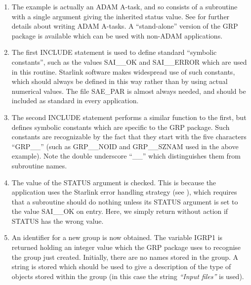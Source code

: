\begin{enumerate}

\item The example is actually an ADAM A-task, and so consists of a subroutine with
a single argument giving the inherited status value. See
 for further
details about writing ADAM A-tasks. A ``stand-alone'' version of the GRP package
is available which can be used with non-ADAM applications.

\item The first INCLUDE statement is used to define standard ``symbolic
constants'', such as the values SAI\_\_OK and SAI\_\_ERROR which are used in
this routine. Starlink software makes widespread use of such constants, which should always
be defined in this way rather than by using actual numerical values. The file
SAE\_PAR is almost always needed, and should be included as standard in every
application.

\item The second INCLUDE statement performs a similar function to the first, but
defines symbolic constants which are specific to the GRP package. Such constants
are recognizable by the fact that they start with the five characters
``GRP\_\_'' (such as GRP\_\_NOID and GRP\_\_SZNAM used in the above example).
Note the double underscore ``\_\_'' which distinguishes them from subroutine
names.

\item The value of the STATUS argument is checked. This is because the
application uses the Starlink error handling strategy (see
), which
requires that a subroutine should do nothing unless its STATUS argument is set
to the value SAI\_\_OK on entry. Here, we simply return without action if STATUS
has the wrong value.

\item An identifier for a new group is now obtained. The variable IGRP1 is
returned holding an integer value which the GRP package uses to recognise the
group just created. Initially, there are no names stored in the group. A string
is stored which should be used to give a description of the type of objects
stored within the group (in this case the string {\em ``Input files''} is
used).


\end{enumerate}

